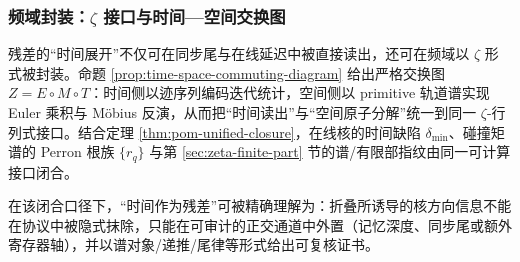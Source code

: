 \subsubsection{频域封装：\texorpdfstring{$\zeta$}{zeta} 接口与时间—空间交换图}\label{subsubsec:frt-zeta-packaging}
残差的“时间展开”不仅可在同步尾与在线延迟中被直接读出，还可在频域以 \(\zeta\) 形式被封装。命题 \ref{prop:time-space-commuting-diagram} 给出严格交换图 \(Z=E\circ M\circ T\)：时间侧以迹序列编码迭代统计，空间侧以 primitive 轨道谱实现 Euler 乘积与 Möbius 反演，从而把“时间读出”与“空间原子分解”统一到同一 \(\zeta\)-行列式接口。结合定理 \ref{thm:pom-unified-closure}，在线核的时间缺陷 \(\delta_{\min}\)、碰撞矩谱的 Perron 根族 \(\{r_q\}\) 与第 \ref{sec:zeta-finite-part} 节的谱/有限部指纹由同一可计算接口闭合。\par
在该闭合口径下，“时间作为残差”可被精确理解为：折叠所诱导的核方向信息不能在协议中被隐式抹除，只能在可审计的正交通道中外置（记忆深度、同步尾或额外寄存器轴），并以谱对象/递推/尾律等形式给出可复核证书。


